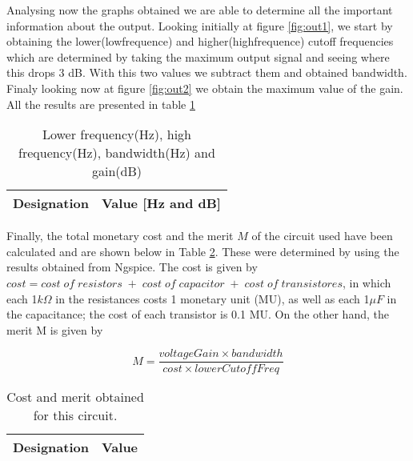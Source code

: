 Analysing now the graphs obtained we are able to determine all the important information about the output. Looking initially at figure \ref{fig:out1}, we start by obtaining the lower(lowfrequence) and higher(highfrequence) cutoff frequencies which are determined by taking the maximum output signal and seeing where this drops 3 dB. With this two values we subtract them and obtained bandwidth. Finaly looking now at figure \ref{fig:out2} we obtain the maximum value of the gain. All the results are presented in table \ref{tab:rip}
\begin{table}[H]
  \centering
  \begin{tabular}{|c|c|}
    \hline
        {\bf Designation} & {\bf Value [Hz and dB]} \\ \hline
        
  \end{tabular}
  \caption{Lower frequency(Hz), high frequency(Hz), bandwidth(Hz) and gain(dB)} 
  \label{tab:rip}
\end{table}



Finally, the total monetary cost and the merit $M$ of the circuit used have been calculated and are shown below in Table \ref{tab:rip1}. These were determined by using the results obtained from Ngspice. The cost is given by $cost=cost\; of\; resistors\; +\; cost\; of\; capacitor\; +\; cost\; of\; transistores$, in which each 1$k\Omega$ in the resistances costs 1 monetary unit (MU), as well as each 1$\mu F$ in the capacitance; the cost of each transistor is 0.1 MU. On the other hand, the  merit M is given by

\begin{equation} \label{eq:merit}
  M=\frac{voltageGain \times bandwidth}{cost\times lowerCutoffFreq} 
\end{equation}


\begin{table}[H]
  \centering
  \begin{tabular}{|c|c|}
    \hline
        {\bf Designation} & {\bf Value} \\ \hline
        
  \end{tabular}
  \caption{Cost and merit obtained for this circuit.} 
  \label{tab:rip1}
\end{table}
